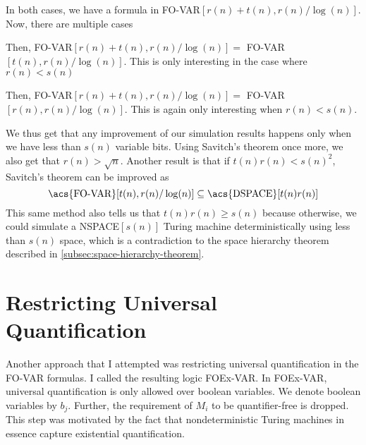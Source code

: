 In both cases, we have a formula in \acs{FO-VAR}$[r(n) + t(n), r(n)/\log(n)]$.
Now, there are multiple cases
\begin{description}
    \setlength\itemsep{0.15em}
    \item[$r(n) \leq t(n)$:]  Then, \acs{FO-VAR}$[r(n) + t(n), r(n)/\log(n)] =$ \acs{FO-VAR}$[t(n), r(n)/\log(n)]$.
    This is only interesting in the case where $r(n) < s(n)$
    \item[$r(n) > t(n)$:] Then, \acs{FO-VAR}$[r(n) + t(n), r(n)/\log(n)] =$ \acs{FO-VAR}$[r(n), r(n)/\log(n)]$.
    This is again only interesting when $r(n) < s(n)$.
\end{description}

We thus get that any improvement of our simulation results happens only when we have less than $s(n)$ variable bits.
Using Savitch's theorem once more, we also get that $r(n) > \sqrt{n}$.
Another result is that if $t(n)r(n) < s(n)^2$, Savitch's theorem can be improved as
\[
    \text{\acs{FO-VAR}}[t(n), r(n)/\log(n)] \subseteq \text{\acs{DSPACE}}[t(n)r(n)]
\]
This same method also tells us that $t(n)r(n) \geq s(n)$ because otherwise, we could simulate a \acs{NSPACE}$[s(n)]$ Turing machine deterministically using less than $s(n)$ space, which is a contradiction to the space hierarchy theorem described in \cref{subsec:space-hierarchy-theorem}.


\section{Restricting Universal Quantification}\label{sec:restricting-universal-quantification}

Another approach that I attempted was restricting universal quantification in the \acs{FO-VAR} formulas.
I called the resulting logic \acs{FOEx-VAR}\@.
In \acs{FOEx-VAR}, universal quantification is only allowed over boolean variables.
We denote boolean variables by $b_j$.
Further, the requirement of $M_i$ to be quantifier-free is dropped.
This step was motivated by the fact that nondeterministic Turing machines in essence capture existential quantification.

